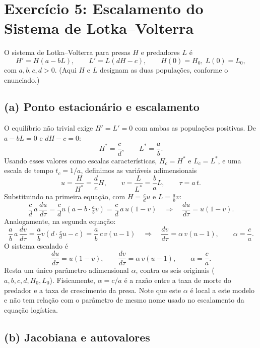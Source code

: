 \documentclass{article}
\begin{document}
\section*{Exercício 5: Escalamento do Sistema de Lotka--Volterra}

O sistema de Lotka--Volterra para presas $H$ e predadores $L$ é
\[
H' = H(a - bL), \qquad L' = L(dH - c), \qquad H(0) = H_0,\ L(0) = L_0,
\]
com $a,b,c,d > 0$. (Aqui $H$ e $L$ designam as duas populações, conforme o
enunciado.)

\subsection*{(a) Ponto estacionário e escalamento}

O equilíbrio não trivial exige $H' = L' = 0$ com ambas as populações positivas.
De $a - bL = 0$ e $dH - c = 0$:
\[
H^* = \frac{c}{d}, \qquad L^* = \frac{a}{b}.
\]
Usando esses valores como escalas características, $H_c = H^*$ e $L_c = L^*$, e uma
escala de tempo $t_c = 1/a$, definimos as variáveis adimensionais
\[
u = \frac{H}{H^*} = \frac{d}{c}H, \qquad
v = \frac{L}{L^*} = \frac{b}{a}L, \qquad
\tau = a\,t.
\]
Substituindo na primeira equação, com $H = \tfrac{c}{d}u$ e $L = \tfrac{a}{b}v$:
\[
\frac{c}{d}\,a\,\frac{du}{d\tau}
= \frac{c}{d}u\left(a - b\cdot\tfrac{a}{b}v\right)
= \frac{c}{d}\,a\,u(1 - v)
\quad\Longrightarrow\quad
\frac{du}{d\tau} = u(1 - v).
\]
Analogamente, na segunda equação:
\[
\frac{a}{b}\,a\,\frac{dv}{d\tau}
= \frac{a}{b}v\left(d\cdot\tfrac{c}{d}u - c\right)
= \frac{a}{b}\,c\,v(u - 1)
\quad\Longrightarrow\quad
\frac{dv}{d\tau} = \alpha\,v(u - 1),
\qquad \alpha = \frac{c}{a}.
\]
O sistema escalado é
\[
\frac{du}{d\tau} = u(1 - v),
\qquad
\frac{dv}{d\tau} = \alpha\,v(u - 1),
\qquad
\alpha = \frac{c}{a}.
\]
Resta um único parâmetro adimensional $\alpha$, contra os seis originais
($a,b,c,d,H_0,L_0$). Fisicamente, $\alpha = c/a$ é a razão entre a taxa de morte
do predador e a taxa de crescimento da presa. Note que este $\alpha$ é local a este
modelo e não tem relação com o parâmetro de mesmo nome usado no escalamento da
equação logística.

\subsection*{(b) Jacobiana e autovalores}
\end{document}
